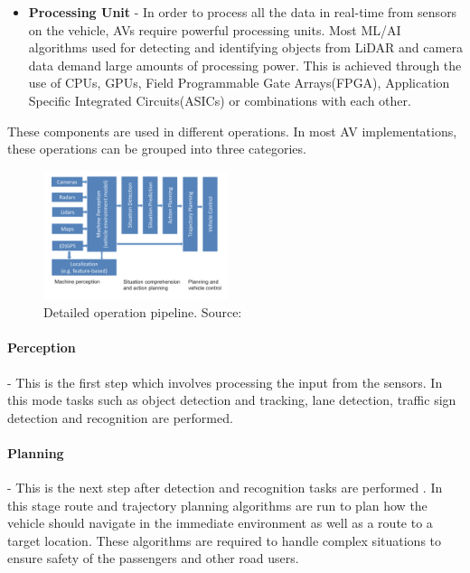 \begin{itemize}
	\item \textbf{Processing Unit} - In order to process all the data in real-time from sensors on the vehicle, AVs require powerful processing units. Most ML/AI algorithms used for detecting and identifying objects from LiDAR and camera data demand large amounts of processing power. This is achieved through the use of CPUs, GPUs, Field Programmable Gate Arrays(FPGA)\cite{brown2012field}, Application Specific Integrated Circuits(ASICs)\cite{smith1997application} or combinations with each other. 

\end{itemize}




These components are used in different operations. In most AV implementations, these operations can be grouped into three categories. 

\begin{figure}
	\centering
	\includegraphics[width=0.48\textwidth]{images/operations}
	\caption{Detailed operation pipeline. Source:\cite{dietmayer2016predicting}}
\end{figure}

\paragraph{Perception} - This is the first step which involves processing the input from the sensors. In this mode tasks such as object detection and tracking, lane detection, traffic sign detection and recognition are performed.
\paragraph{Planning} - This is the next step after detection and recognition tasks are performed . In this stage route and trajectory planning algorithms are run to plan how the vehicle should navigate in the immediate environment as well as a route to a target location. These algorithms are required to handle complex situations to ensure safety of the passengers and other road users. 
